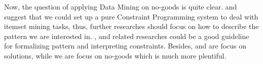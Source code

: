 \documentclass{article}
\begin{document}
Now, the question of applying Data Mining on no-goods is quite clear. \cite{de2008constraint} and \cite{guns2011itemset} suggest that we could set up a pure Constraint Programming system to deal with itemset mining tasks, thus, further researches should focus on how to describe the pattern we are interested in. \cite{colton2001constraint}, \cite{charnley2006automatic} and related researches could be a good guideline for formalizing pattern and interpreting constraints. Besides, \cite{colton2001constraint} and \cite{charnley2006automatic} are focus on solutions, while we are focus on no-goods which is much more plentiful.

\pagebreak



\end{document}
